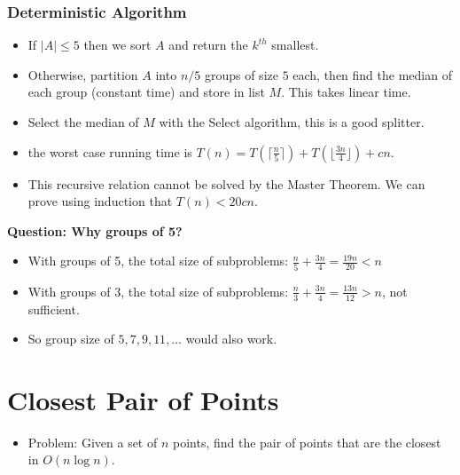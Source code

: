 \documentclass[a4paper]{article}
\begin{document}
\subsubsection{Deterministic Algorithm}
\begin{itemize}
    \item If $|A|\leq 5$ then we sort $A$ and return the $k^{th}$ smallest.
    \item Otherwise, partition $A$ into $n/5$ groups of size $5$ each, then find the median of each group (constant time) and store in list $M$. This takes linear time.
    \item Select the median of $M$ with the Select algorithm, this is a good splitter.
    \item the worst case running time is $T(n)=T(\lceil\frac{n}{5}\rceil)+T(\lfloor{\frac{3n}{4}}\rfloor)+cn$.
    \item This recursive relation cannot be solved by the Master Theorem. We can prove using induction that $T(n)<20cn$.
\end{itemize}
\textbf{Question: Why groups of 5?}
\begin{itemize}
    \item With groups of 5, the total size of subproblems: $\frac{n}{5}+\frac{3n}{4}=\frac{19n}{20}<n$
    \item With groups of 3, the total size of subproblems: $\frac{n}{3}+\frac{3n}{4}=\frac{13n}{12}>n$, not sufficient.
    \item So group size of $5,7,9,11,\dots$ would also work.
\end{itemize}

\section{Closest Pair of Points}
\begin{itemize}
    \item Problem: Given a set of $n$ points, find the pair of points that are the closest in $O(n\log n)$.
\end{itemize}
\end{document}
